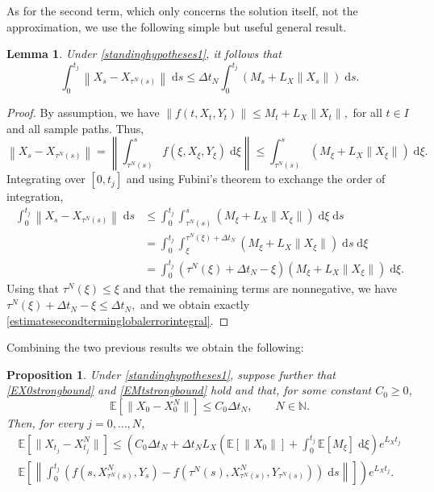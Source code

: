 \documentclass[reqno,12pt]{amsart}
\theoremstyle{plain} %
\newtheorem{lemma}{Lemma}[section]
\newtheorem{proposition}{Proposition}[section]
\theoremstyle{definition} %
\begin{document}
As for the second term, which only concerns the solution itself, not the approximation, we use the following simple but useful general result.

\begin{lemma}
    \label{lemestimatesecondterminglobalerror}
    Under \cref{standinghypotheses1}, it follows that
    \begin{equation}
        \label{estimatesecondterminglobalerrorintegral}
        \int_0^{t_j}\left\|X_s - X_{\tau^N(s)}\right\| \;\mathrm{d}s \leq \Delta t_N \int_0^{t_j} (M_s + L_X\|X_s\|) \;\mathrm{d}s.
    \end{equation}
\end{lemma}

\begin{proof}
    By assumption, we have $\|f(t, X_t, Y_t)\| \leq M_t + L_X\|X_t\|,$ for all $t\in I$ and all sample paths. Thus,
    \[
      \left\|X_s - X_{\tau^N(s)}\right\| = \left\|\int_{\tau^N(s)}^s f(\xi, X_\xi, Y_\xi)\;\mathrm{d}\xi\right\| \leq \int_{\tau^N(s)}^s (M_\xi + L_X\|X_\xi\|)\;\mathrm{d}\xi.
    \]
    Integrating over $[0, t_j]$ and using Fubini's theorem to exchange the order of integration,
    \begin{align*}
        \int_0^{t_j}\left\|X_s - X_{\tau^N(s)}\right\| \;\mathrm{d}s & \leq \int_0^{t_j}\int_{\tau^N(s)}^s (M_\xi + L_X\|X_\xi\|) \;\mathrm{d}\xi \;\mathrm{d}s \\
        & = \int_0^{t_j}\int_\xi^{\tau^N(\xi) + \Delta t_N} (M_\xi + L_X\|X_\xi\|) \;\mathrm{d}s \;\mathrm{d}\xi \\
        & =  \int_0^{t_j} (\tau^N(\xi) + \Delta t_N - \xi) (M_\xi + L_X\|X_\xi\|) \;\mathrm{d}\xi.
    \end{align*}
    Using that $\tau^N(\xi) \leq \xi$ and that the remaining terms are nonnegative, we have $\tau^N(\xi) + \Delta t_N - \xi \leq \Delta t_N,$ and we obtain exactly \eqref{estimatesecondterminglobalerrorintegral}.
\end{proof}

Combining the two previous results we obtain the following:

\begin{proposition}
    \label{propbasicestimate}
    Under \cref{standinghypotheses1}, suppose further that \eqref{EX0strongbound} and \eqref{EMtstrongbound} hold and that, for some constant $C_0 \geq 0$, 
    \begin{equation}
        \label{EX0X0N}
        \mathbb{E}[\|X_0 - X_0^N\|] \leq C_0 \Delta t_N, \qquad N\in \mathbb{N}.
    \end{equation}
    Then, for every $j = 0, \ldots, N$,
    \begin{multline}
        \label{expectedestimateglobalerrorintegral}
            \mathbb{E} \left[\|X_{t_j} - X_{t_j}^N\|\right] \leq \left( C_0 \Delta t_N + \Delta t_N L_X \left(\mathbb{E}[\|X_0\|] + \int_0^{t_j} \mathbb{E}[M_\xi]\;\mathrm{d}\xi\right)e^{L_X t_j}\right. \\
            \left. \mathbb{E}\left[\left\|\int_0^{t_j} \left( f(s, X_{\tau^N(s)}^N, Y_s) - f(\tau^N(s), X_{\tau^N(s)}^N, Y_{\tau^N(s)}) \right)\;\mathrm{d}s\right\|\right]\right) e^{L_X t_j}.
    \end{multline}
\end{proposition}
\end{document}
